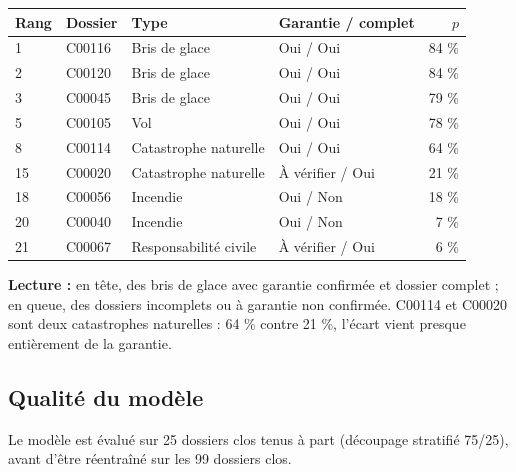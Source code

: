 \documentclass[11pt,a4paper]{article}
\begin{document}
\begin{center}
\small
\begin{tabular}{llllr}
\toprule
Rang & Dossier & Type & Garantie / complet & $p$ \\
\midrule
1 & C00116 & Bris de glace & Oui / Oui & 84 \% \\
2 & C00120 & Bris de glace & Oui / Oui & 84 \% \\
3 & C00045 & Bris de glace & Oui / Oui & 79 \% \\
5 & C00105 & Vol & Oui / Oui & 78 \% \\
8 & C00114 & Catastrophe naturelle & Oui / Oui & 64 \% \\
15 & C00020 & Catastrophe naturelle & À vérifier / Oui & 21 \% \\
18 & C00056 & Incendie & Oui / Non & 18 \% \\
20 & C00040 & Incendie & Oui / Non & 7 \% \\
21 & C00067 & Responsabilité civile & À vérifier / Oui & 6 \% \\
\bottomrule
\end{tabular}
\end{center}
\textbf{Lecture :} en tête, des bris de glace avec garantie confirmée et dossier complet ; en queue,
des dossiers incomplets ou à garantie non confirmée. C00114 et C00020 sont deux catastrophes
naturelles : 64 \% contre 21 \%, l'écart vient presque entièrement de la garantie.

\subsection{Qualité du modèle}
Le modèle est évalué sur 25 dossiers clos tenus à part (découpage stratifié 75/25), avant d'être
réentraîné sur les 99 dossiers clos.
\end{document}
